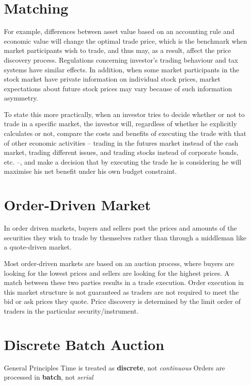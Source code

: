 \documentclass{article}
\begin{document}
\section{Matching}

For example, differences between asset value based on an accounting rule and economic value will change the optimal trade price, which is the benchmark when market participants wish to trade, and thus may, as a result, affect the price discovery process. Regulations concerning investor’s trading behaviour and tax systems have similar effects. In addition, when some market participants in the stock market have private information on individual stock prices, market expectations about future stock prices may vary because of such information asymmetry.

 To state this more practically, when an investor tries to decide whether or not to trade in a specific market, the investor will, regardless of whether he explicitly calculates or not, compare the costs and benefits of executing the trade with that of other economic activities – trading in the futures market instead of the cash market, trading different issues, and trading stocks instead of corporate bonds, etc. –, and make a decision that by executing the trade he is considering he will maximise his net benefit under his own budget constraint.

\section{Order-Driven Market}
In order driven markets, buyers and sellers post the prices and amounts of the securities they wish to trade by themselves rather than through a middleman like a quote-driven market.

Most order-driven markets are based on an auction process, where buyers are looking for the lowest prices and sellers are looking for the highest prices. A match between these two parties results in a trade execution. Order execution in this market structure is not guaranteed as traders are not required to meet the bid or ask prices they quote. Price discovery is determined by the limit order of traders in the particular security/instrument. 

\section{Discrete Batch Auction}

General Principles
Time is treated as \textbf{discrete}, not \textit{continuous}
Orders are processed in \textbf{batch}, not \textit{serial}
\end{document}
